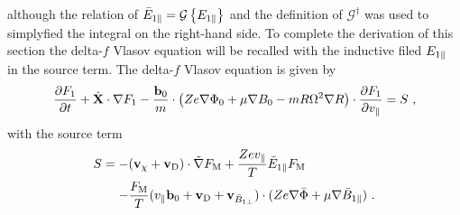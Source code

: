 although the relation of $\bar{E}_{1\parallel} =  \mathcal{G} \left\{E_{1\parallel}\right\}$ and the definition of $\mathcal{G}^\dagger$ was used to simplyfied the integral on the right-hand side. To complete the derivation of this section the delta-\!$f$ Vlasov equation will be recalled with the inductive filed $E_{1\parallel}$ in the source term. The delta-\!$f$ Vlasov equation is given by
\begin{gather}
	\frac{\partial F_1}{\partial t} + \dot{\boldsymbol{\mathbf{X}}} \cdot \nabla F_1 - \frac{\boldsymbol{\mathbf{b}}_0}{m} \cdot \left(Ze\nabla \Phi_0 + \mu \nabla B_0 - mR \Omega^2 \nabla R \right) \cdot \frac{\partial F_1}{\partial v_\parallel} = S~,
	\label{eq:gyrocenterDeltafSubVlasovRecall}
\end{gather}
with the source term
\begin{gather}
	\begin{aligned}
		S = -& (\boldsymbol{\mathbf{v}}_\chi + \boldsymbol{\mathbf{v}}_\mathrm{D}) \cdot \tilde{\nabla} F_\mathrm{M} + \frac{Z e v_\parallel}{T} \bar{E}_{1\parallel} F_\mathrm{M} \\
		    -& \frac{F_\mathrm{M}}{T} (v_\parallel \boldsymbol{\mathbf{b}}_0 + \boldsymbol{\mathbf{v}}_\mathrm{D} + \boldsymbol{\mathbf{v}}_{\bar{B}_{1\perp}}) \cdot (Z e \nabla \bar{\Phi} + \mu \nabla \bar{B}_{1\parallel})~.
	\end{aligned}
	\label{eq:sourceTermElectric}
\end{gather}

